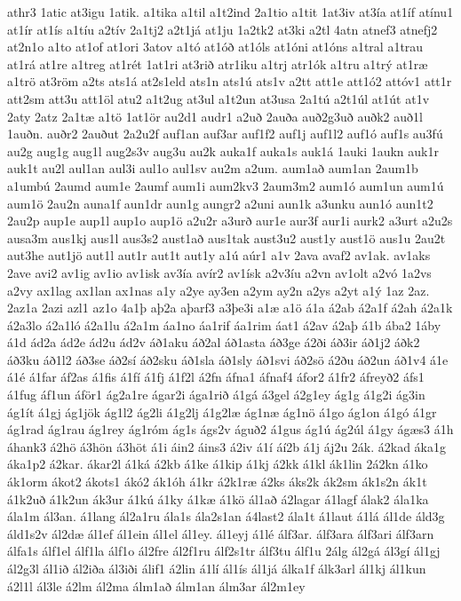 {athr3
1atic
at3igu
1atik.
a1tika
a1til
a1t2ind
2a1tio
a1tit
1at3iv
at3ía
at1íf
atínu1
at1ír
at1ís
a1tíu
a2tív
2a1tj2
a2t1já
at1ju
1a2tk2
at3ki
a2tl
4atn
atnef3
atnefj2
at2n1o
a1to
at1of
at1ori
3atov
a1tó
at1óð
at1óls
at1óni
at1óns
a1tral
a1trau
at1rá
at1re
a1treg
at1rét
1at1ri
at3rið
atr1iku
a1trj
atr1ók
a1tru
a1trý
at1ræ
a1trö
at3röm
a2ts
ats1á
at2s1eld
ats1n
ats1ú
ats1v
a2tt
att1e
att1ó2
attóv1
att1r
att2sm
att3u
att1öl
atu2
a1t2ug
at3ul
a1t2un
at3usa
2a1tú
a2t1úl
at1út
at1v
2aty
2atz
2a1tæ
a1tö
1at1ör
au2d1
audr1
a2uð
2auða
auð2g3uð
auðk2
auð1l
1auðn.
auðr2
2auðut
2a2u2f
auf1an
auf3ar
auf1f2
auf1j
auf1l2
auf1ó
auf1s
au3fú
au2g
aug1g
aug1l
aug2s3v
aug3u
au2k
auka1f
auka1s
auk1á
1auki
1aukn
auk1r
auk1t
au2l
aul1an
aul3i
aul1o
aul1sv
au2m
a2um.
aum1að
aum1an
2aum1b
a1umbú
2aumd
aum1e
2aumf
aum1i
aum2kv3
2aum3m2
aum1ó
aum1un
aum1ú
aum1ö
2au2n
auna1f
aun1dr
aun1g
aungr2
a2uni
aun1k
a3unku
aun1ó
aun1t2
2au2p
aup1e
aup1l
aup1o
aup1ö
a2u2r
a3urð
aur1e
aur3f
aur1i
aurk2
a3urt
a2u2s
ausa3m
aus1kj
aus1l
aus3s2
aust1að
aus1tak
aust3u2
aust1y
aust1ö
aus1u
2au2t
aut3he
aut1jö
aut1l
aut1r
aut1t
aut1y
a1ú
aúr1
a1v
2ava
avaf2
av1ak.
av1aks
2ave
avi2
av1ig
av1io
av1isk
av3ía
avír2
av1ísk
a2v3íu
a2vn
av1olt
a2vó
1a2vs
a2vy
ax1lag
ax1lan
ax1nas
a1y
a2ye
ay3en
a2ym
ay2n
a2ys
a2yt
a1ý
1az
2az.
2az1a
2azi
azl1
az1o
4a1þ
aþ2a
aþarf3
a3þe3i
a1æ
a1ö
á1a
á2ab
á2a1f
á2ah
á2a1k
á2a3lo
á2a1ló
á2a1lu
á2a1m
áa1no
áa1rif
áa1rim
áat1
á2av
á2aþ
á1b
ába2
1áby
á1d
ád2a
ád2e
ád2u
ád2v
áð1aku
áð2al
áð1asta
áð3ge
á2ði
áð3ir
áð1j2
áðk2
áð3ku
áð1l2
áð3se
áð2sí
áð2sku
áð1sla
áð1sly
áð1svi
áð2sö
á2ðu
áð2un
áð1v4
á1e
á1é
á1far
áf2as
á1fis
á1fí
á1fj
á1f2l
á2fn
áfna1
áfnaf4
áfor2
á1fr2
áfreyð2
áfs1
á1fug
áf1un
áför1
ág2a1re
ágar2i
ága1rið
á1gá
á3gel
á2g1ey
ág1g
á1g2i
ág3in
ág1ít
á1gj
ág1jök
ág1l2
ág2li
á1g2lj
á1g2læ
ág1næ
ág1nö
á1go
ág1on
á1gó
á1gr
ág1rad
ág1rau
ág1rey
ág1róm
ág1s
ágs2v
águð2
á1gus
ág1ú
ág2úl
á1gy
ágæs3
á1h
áhank3
á2hö
á3hön
á3höt
á1i
áin2
áins3
á2iv
á1í
áí2b
á1j
áj2u
2ák.
á2kad
áka1g
áka1p2
á2kar.
ákar2l
á1ká
á2kb
á1ke
á1kip
á1kj
á2kk
á1kl
ák1lin
2á2kn
á1ko
ák1orm
ákot2
ákots1
ákó2
ák1óh
á1kr
á2k1ræ
á2ks
áks2k
ák2sm
ák1s2n
ák1t
á1k2uð
á1k2un
ák3ur
á1kú
á1ky
á1kæ
á1kö
ál1að
á2lagar
á1lagf
álak2
ála1ka
ála1m
ál3an.
á1lang
ál2a1ru
ála1s
ála2s1an
á4last2
ála1t
á1laut
á1lá
ál1de
áld3g
áld1s2v
ál2dæ
ál1ef
ál1ein
ál1el
ál1ey.
ál1eyj
á1lé
álf3ar.
álf3ara
álf3ari
álf3arn
álfa1s
álf1el
álf1la
álf1o
ál2fre
ál2f1ru
álf2s1tr
álf3tu
álf1u
2álg
ál2gá
ál3gí
ál1gj
ál2g3l
ál1ið
ál2iða
ál3iði
álif1
á2lin
á1lí
ál1ís
ál1já
álka1f
álk3arl
ál1kj
ál1kun
á2l1l
ál3le
á2lm
ál2ma
álm1að
álm1an
álm3ar
ál2m1ey
}
